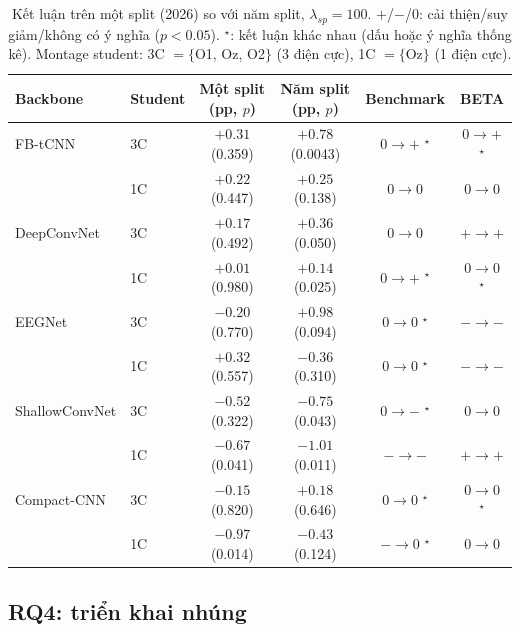 \documentclass[11pt,a4paper,twoside,asymmetric]{article}
\begin{document}
\begin{table}[htbp]
\caption{Kết luận trên một split (2026) so với năm split, $\lambda_{sp}=100$. $+$/$-$/$0$: cải thiện/suy giảm/không có ý nghĩa ($p<0.05$). $^\star$: kết luận khác nhau (dấu hoặc ý nghĩa thống kê). Montage student: 3C $=\{$O1, Oz, O2$\}$ (3 điện cực), 1C $=\{$Oz$\}$ (1 điện cực).}
\label{tab:rq3}
\begin{center}
\footnotesize
\begin{tabular}{llcccc}
\toprule
Backbone & Student & Một split (pp, $p$) & Năm split (pp, $p$) & Benchmark & BETA \\
\midrule
FB-tCNN & 3C & $+0.31$ (0.359) & $+0.78$ (0.0043) & $0 \to +$ $^\star$ & $0 \to +$ $^\star$ \\
 & 1C & $+0.22$ (0.447) & $+0.25$ (0.138) & $0 \to 0$ & $0 \to 0$ \\
DeepConvNet & 3C & $+0.17$ (0.492) & $+0.36$ (0.050) & $0 \to 0$ & $+ \to +$ \\
 & 1C & $+0.01$ (0.980) & $+0.14$ (0.025) & $0 \to +$ $^\star$ & $0 \to 0$ $^\star$ \\
EEGNet & 3C & $-0.20$ (0.770) & $+0.98$ (0.094) & $0 \to 0$ $^\star$ & $- \to -$ \\
 & 1C & $+0.32$ (0.557) & $-0.36$ (0.310) & $0 \to 0$ $^\star$ & $- \to -$ \\
ShallowConvNet & 3C & $-0.52$ (0.322) & $-0.75$ (0.043) & $0 \to -$ $^\star$ & $0 \to 0$ \\
 & 1C & $-0.67$ (0.041) & $-1.01$ (0.011) & $- \to -$ & $+ \to +$ \\
Compact-CNN & 3C & $-0.15$ (0.820) & $+0.18$ (0.646) & $0 \to 0$ $^\star$ & $0 \to 0$ $^\star$ \\
 & 1C & $-0.97$ (0.014) & $-0.43$ (0.124) & $- \to 0$ $^\star$ & $0 \to 0$ \\
\bottomrule
\end{tabular}
\end{center}
\end{table}

\subsection{RQ4: triển khai nhúng}
\label{sec:rq4}
\end{document}
